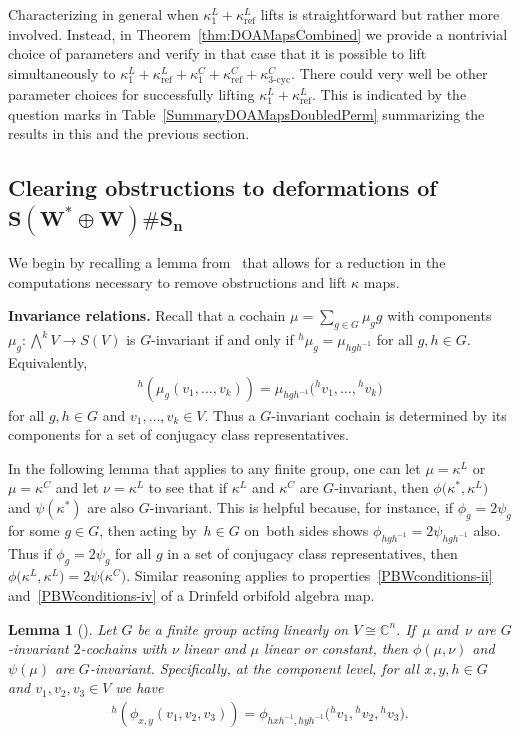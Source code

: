 \documentclass[10pt,a4paper]{amsart}
\numberwithin{equation}{section}
\newtheorem{Lemma}[Theorem]{Lemma}
\newcommand{\actby}[1]{{}^{#1}}
\DeclareMathOperator{\refl}{ref}
\DeclareMathOperator{\tri}{3-cyc}
\begin{document}
Characterizing in general when $\kappa^L_1+\kappa^L_{\refl}$ lifts is
straightforward but rather more involved. Instead, in
Theorem~\ref{thm:DOAMapsCombined} we provide a nontrivial choice of parameters
and verify in that case that it is possible to lift simultaneously to
$\kappa^L_1+\kappa^L_{\refl}+\kappa^C_1+\kappa^C_{\refl}+\kappa^C_{\tri}$.
There could very well be other parameter choices for successfully lifting $\kappa_1^L+\kappa^L_{\refl}$. This is indicated by the question marks in Table~\ref{SummaryDOAMapsDoubledPerm} summarizing the results in this
and the previous section.

\subsection[Clearing obstructions to deformations of S(W* + W) Sn]
{Clearing obstructions to deformations of $\boldsymbol{S(W^* \oplus W)\# S_n}$}\label{ObstructionDetails}

We begin by recalling a lemma from~\cite{FGK} that allows
for a reduction in the computations necessary to remove obstructions and lift $\kappa$ maps.

\medskip\noindent
{\bf Invariance relations.}
Recall that a cochain $\mu=\!\sum_{g\in G}\mu_gg$ with components $\mu_g\colon \bigwedge^k V\!\to S(V)$ is $G$-invariant if and only if $\actby{h}\mu_g=\mu_{hgh^{-1}}$ for all $g,h\in G$.
Equivalently,
\begin{gather*}
\actby{h}(\mu_g(v_1,\ldots,v_k))=\mu_{hgh^{-1}}\big(\actby{h}v_1,\ldots,\actby{h}v_k\big)
\end{gather*}
for all $g,h\in G$ and $v_1,\ldots,v_k\in V$. Thus a $G$-invariant cochain is
determined by its components for a set of conjugacy class representatives.

In the following lemma that applies to any finite group, one can let $\mu=\kappa^L$ or $\mu=\kappa^C$ and let $\nu=\kappa^L$ to see that if $\kappa^L$ and $\kappa^C$ are $G$-invariant,
then $\phi\big(\kappa^{*},\kappa^L\big)$ and $\psi(\kappa^{*})$ are also $G$-invariant. This is helpful because, for instance, if $\phi_g=2\psi_g$ for some $g\in G$, then acting by~$h\in G$ on~both sides shows $\phi_{hgh^{-1}}=2\psi_{hgh^{-1}}$ also. Thus if $\phi_g=2\psi_g$ for all $g$ in a set of conjugacy class representatives, then $\phi\big(\kappa^L,\kappa^L\big)=2\psi\big(\kappa^C\big)$. Similar reasoning applies to properties~\eqref{PBWconditions-ii} and~\eqref{PBWconditions-iv} of a Drinfeld orbifold algebra map.

\begin{Lemma}[{\rm \cite[Lemma 5.1]{FGK}}]	\label{le:orbitphixyphig}
	Let $G$ be a finite group acting linearly on $V\cong\mathbb{C}^n$. If~$\mu$ and~$\nu$ are $G$-invariant $2$-cochains with $\nu$ linear and $\mu$ linear or constant,
	then $\phi(\mu,\nu)$ and $\psi(\mu)$ are $G$-invariant. Specifically, at
	the component level, for all $x,y,h\in G$ and $v_1,v_2,v_3\in V$ we have
	\begin{gather*}
	\actby{h}(\phi_{x,y}(v_1,v_2,v_3))=\phi_{hxh^{-1},hyh^{-1}}\big(\actby{h}v_1,\actby{h}v_2,\actby{h}v_3\big).
	\end{gather*}
\end{Lemma}
\end{document}
